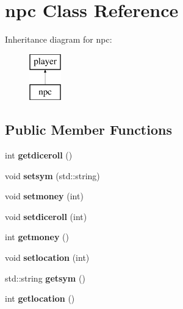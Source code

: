 \hypertarget{classnpc}{}\section{npc Class Reference}
\label{classnpc}
Inheritance diagram for npc\+:\begin{figure}[H]
\begin{center}
\leavevmode
\includegraphics[height=2.000000cm]{classnpc}
\end{center}
\end{figure}
\subsection*{Public Member Functions}
\begin{DoxyCompactItemize}
\item 
\mbox{\label{classnpc_a0c66aaba637245cbbf97e95a91fcde63}} 
int {\bfseries getdiceroll} ()
\item 
\mbox{\label{classnpc_a49689af5ce8ade822d9ba59962e5cba7}} 
void {\bfseries setsym} (std\+::string)
\item 
\mbox{\label{classnpc_a042e66a225b11b297f1f34a6036b5787}} 
void {\bfseries setmoney} (int)
\item 
\mbox{\label{classnpc_a8f5e3be304c433eb40219821d057fd09}} 
void {\bfseries setdiceroll} (int)
\item 
\mbox{\label{classnpc_ac7518795a5a6202176d04ca15b25d05e}} 
int {\bfseries getmoney} ()
\item 
\mbox{\label{classnpc_ad6193ea6e422b7ef1e2ea5bf43a34d2c}} 
void {\bfseries setlocation} (int)
\item 
\mbox{\label{classnpc_a86deebc7fda2ea2db6b31f718c3c6c4b}} 
std\+::string {\bfseries getsym} ()
\item 
\mbox{\label{classnpc_a9b36dad204bf2d50ba2f4af62998993f}} 
int {\bfseries getlocation} ()
\end{DoxyCompactItemize}
